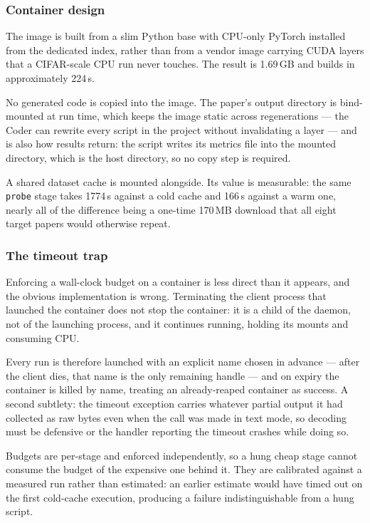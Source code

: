 \documentclass[10pt,twocolumn]{article}
\begin{document}
\subsubsection{Container design}

The image is built from a slim Python base with CPU-only PyTorch installed from the
dedicated index, rather than from a vendor image carrying CUDA layers that a CIFAR-scale
CPU run never touches. The result is 1.69\,GB and builds in approximately 224\,s.

No generated code is copied into the image. The paper's output directory is bind-mounted
at run time, which keeps the image static across regenerations --- the Coder can rewrite
every script in the project without invalidating a layer --- and is also how results
return: the script writes its metrics file into the mounted directory, which is the host
directory, so no copy step is required.

A shared dataset cache is mounted alongside. Its value is measurable: the same
\texttt{probe} stage takes 1774\,s against a cold cache and 166\,s against a warm one,
nearly all of the difference being a one-time 170\,MB download that all eight target
papers would otherwise repeat.

\subsubsection{The timeout trap}

Enforcing a wall-clock budget on a container is less direct than it appears, and the
obvious implementation is wrong. Terminating the client process that launched the
container does not stop the container: it is a child of the daemon, not of the launching
process, and it continues running, holding its mounts and consuming CPU.

Every run is therefore launched with an explicit name chosen in advance --- after the
client dies, that name is the only remaining handle --- and on expiry the container is
killed by name, treating an already-reaped container as success. A second subtlety: the
timeout exception carries whatever partial output it had collected as raw bytes even when
the call was made in text mode, so decoding must be defensive or the handler reporting the
timeout crashes while doing so.

Budgets are per-stage and enforced independently, so a hung cheap stage cannot consume the
budget of the expensive one behind it. They are calibrated against a measured run rather
than estimated: an earlier estimate would have timed out on the first cold-cache execution,
producing a failure indistinguishable from a hung script.
\end{document}
